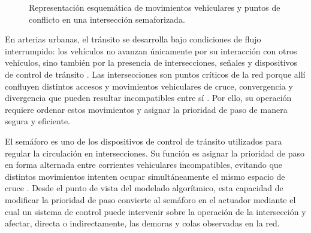 \begin{figure}[H]
    \centering
    \caption{Representación esquemática de movimientos vehiculares y puntos de conflicto en una intersección semaforizada.}
    \label{fig:conflictos_interseccion}
\end{figure}

En arterias urbanas, el tránsito se desarrolla bajo condiciones de flujo interrumpido: los vehículos no avanzan únicamente por su interacción con otros vehículos, sino también por la presencia de intersecciones, señales y dispositivos de control de tránsito \cite[pp.~320--324]{ite_handbook}. Las intersecciones son puntos críticos de la red porque allí confluyen distintos accesos y movimientos vehiculares de cruce, convergencia y divergencia que pueden resultar incompatibles entre sí \cite[pp.~321--323]{ite_handbook}. Por ello, su operación requiere ordenar estos movimientos y asignar la prioridad de paso de manera segura y eficiente.

El semáforo es uno de los dispositivos de control de tránsito utilizados para regular la circulación en intersecciones. Su función es asignar la prioridad de paso en forma alternada entre corrientes vehiculares incompatibles, evitando que distintos movimientos intenten ocupar simultáneamente el mismo espacio de cruce \cite[Cap.~1, Sec.~1.2]{fernandez}. Desde el punto de vista del modelado algorítmico, esta capacidad de modificar la prioridad de paso convierte al semáforo en el actuador mediante el cual un sistema de control puede intervenir sobre la operación de la intersección y afectar, directa o indirectamente, las demoras y colas observadas en la red.

